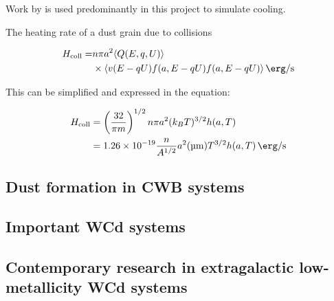 Work by \cite{dwek_infrared_1981} is used predominantly in this project to simulate cooling. 


The heating rate of a dust grain due to collisions 

\begin{equation}
  \begin{split} 
      H_\text{coll} = & n \pi a^2 \langle Q(E,q,U) \rangle \\
      & \times \langle v (E-qU) f(a,E-qU) f(a,E-qU) \rangle \, \si{\erg\per\second}
  \end{split}
\end{equation}

This can be simplified and expressed in the equation:

\begin{equation}
  \begin{split}
    H_\text{coll} & = \left(\frac{32}{\pi m}\right)^{1/2} n\pi a^2 (k_B T)^{3/2} h(a,T) \\
    & = \num{1.26e-19} \frac{n}{A^{1/2}} a^2 (\si{\micro\metre}) T^{3/2} h(a,T) \, \si{\erg\per\second}
  \end{split}
\end{equation}







\subsection{Dust formation in CWB systems}
\label{sec:cwbdust}





\subsection{Important WCd systems}

\subsection{Contemporary research in extragalactic low-metallicity WCd systems}

\label{sec:knowndustysystems}

